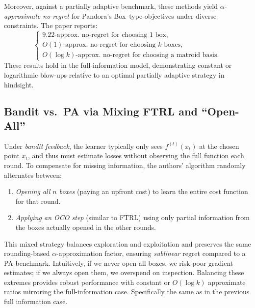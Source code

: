 \documentclass[11pt,a4paper]{article}
\begin{document}
Moreover, against a partially adaptive benchmark, these methods yield \emph{$\alpha$-approximate no-regret} for Pandora’s Box–type objectives under diverse constraints. The paper reports:
\[
\begin{cases}
\text{9.22-approx.\ no-regret for choosing 1 box},\\
O(1)\text{-approx.\ no-regret for choosing $k$ boxes},\\
O(\log k)\text{-approx.\ no-regret for choosing a matroid basis}.
\end{cases}
\]
These results hold in the full-information model, demonstrating constant or logarithmic blow-ups relative to an optimal partially adaptive strategy in hindsight.

\subsection*{Bandit vs.\ PA via Mixing FTRL and ``Open-All''}
Under \emph{bandit feedback}, the learner typically only sees $f^{(t)}(x_t)$ at the chosen point $x_t$, and thus must estimate losses without observing the full function each round. To compensate for missing information, the authors' algorithm randomly alternates between:
\begin{enumerate}
  \item \emph{Opening all $n$ boxes} (paying an upfront cost) to learn the entire cost function for that round.
  \item \emph{Applying an OCO step} (similar to FTRL) using only partial information from the boxes actually opened in the other rounds.
\end{enumerate}
This mixed strategy balances exploration and exploitation and preserves the same rounding-based \(\alpha\)-approximation factor, ensuring \emph{sublinear} regret compared to a PA benchmark. Intuitively, if we never open all boxes, we risk poor gradient estimates; if we always open them, we overspend on inspection. Balancing these extremes provides robust performance with constant or $O(\log k)$ approximate ratios mirroring the full-information case. Specifically the same as in the previous full information case.
\end{document}
